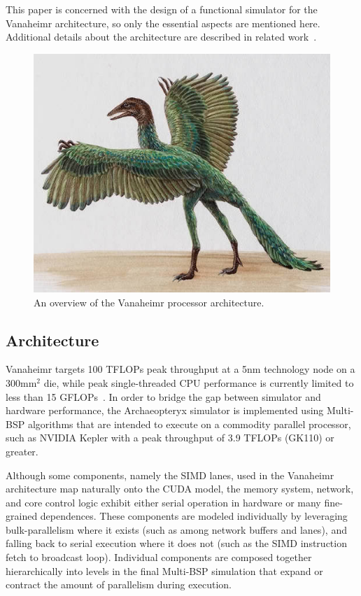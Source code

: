 \documentclass[conference, 10pt]{IEEEtran}
\begin{document}
This paper is concerned with the design of a functional simulator for the
Vanaheimr architecture, so only the essential aspects are mentioned here. 
Additional details about the architecture are described in related
work~\cite{ref:vanaheimr}.  

\begin{figure}
	\begin{center}
		\includegraphics[width=0.9\linewidth]{archaeopteryx-bird}
		\caption{An overview of the Vanaheimr processor architecture.}
		\label{fig:vanaheimr}
	\end{center}
\end{figure}

\subsection{Architecture}
Vanaheimr targets 100 TFLOPs peak throughput at a 5nm technology node on a
300mm$^2$ die, while peak single-threaded CPU performance is currently limited
to less than 15 GFLOPs~\cite{ref:sandybridge-peak}.  In order to bridge the gap
between simulator and hardware performance, the Archaeopteryx simulator is
implemented using Multi-BSP algorithms that are intended to execute on a
commodity parallel processor, such as NVIDIA Kepler with a peak throughput of
3.9 TFLOPs (GK110) or greater.

Although some components, namely the SIMD lanes, used in the Vanaheimr
architecture map naturally onto the CUDA model, the memory system, network,
and core control logic exhibit either serial operation in hardware or many
fine-grained dependences.  These components are modeled individually by
leveraging bulk-parallelism where it exists (such as among network buffers and
lanes), and falling back to serial execution where it does not (such as the
SIMD instruction fetch to broadcast loop). Individual components are composed 
together hierarchically into levels in the final Multi-BSP simulation that
expand or contract the amount of parallelism during execution.  
\end{document}
